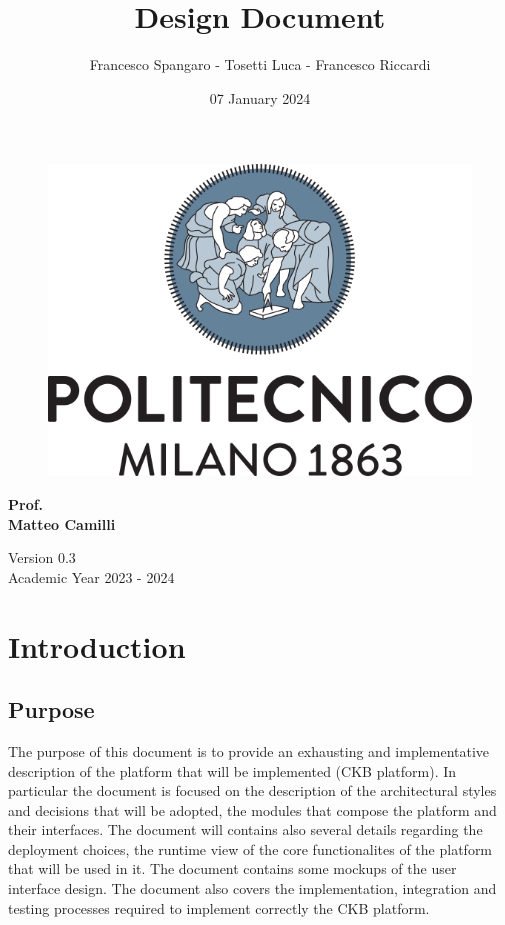 \documentclass{article}
\title{\Huge{\textbf{Design Document}}}
\author{\Large{Francesco Spangaro - Tosetti Luca - Francesco Riccardi}}
\date{07 January 2024}
\begin{document}
\maketitle

\begin{figure}[h]
    \centering
    \includegraphics[scale=0.6]{politecnico-di-milano-logo.png}
\end{figure}

\vspace*{1cm}
\begin{center}
      \Large{\textbf{Prof.}} \\
      \Large{\textbf{Matteo Camilli}}
\end{center}
\vspace*{1cm}

\begin{center}
      \large{Version 0.3} \\
      \large{Academic Year 2023 - 2024}
\end{center}
\newpage
\tableofcontents


\pagestyle{IntroductionStyle}

\section{Introduction}
\subsection{Purpose}
The purpose of this document is to provide an exhausting and implementative
description of the platform that will be implemented (CKB platform).
In particular the document is focused on the description of the architectural styles and decisions
that will be adopted, the modules that compose the platform and their interfaces.
The document will contains also several details regarding the deployment choices,
the runtime view of the core functionalites of the platform that will be used in it.
The document contains some mockups of the user interface design.
The document also covers the implementation, integration and testing
processes required to implement correctly the CKB platform.
\end{document}
